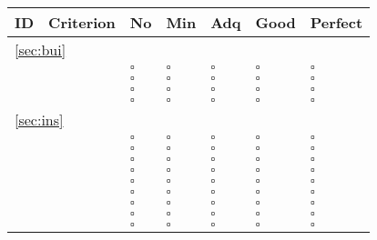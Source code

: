 \documentclass[a4paper,11pt]{article}
\begin{document}
\begin{table}[hbt]
	\begin{tabular}
		{ p{} | 
		  p{} |
		  p{} |
		  p{} |
		  p{} |
		  p{} |
		  p{} }
		\hline
		\textbf{ID} & \textbf{Criterion} & \textbf{No} & \textbf{Min} & \textbf{Adq} & \textbf{Good} & \textbf{Perfect} \\
        \hline
        \multicolumn{7}{l}{\ref{sec:bui}{ }\nameref{sec:bui}} \\
		\hline
		\hyperref[id:b1]{\bOneID} & \bOneText & $\square$ & $\square$ & $\square$ & $\square$ & $\square$ \\
		\hyperref[id:b2]{\bTwoID} & \bTwoText & $\square$ & $\square$ & $\square$ & $\square$ & $\square$ \\
		\hyperref[id:b3]{\bThreeID} & \bThreeText & $\square$ & $\square$ & $\square$ & $\square$ & $\square$ \\
		\hyperref[id:b4]{\bFourID} & \bFourText & $\square$ & $\square$ & $\square$ & $\square$ & $\square$ \\
		\hline			
		\multicolumn{7}{l}{\ref{sec:ins}{ }\nameref{sec:ins}} \\
		\hline
		\hyperref[id:is1]{\isOneID} & \isOneText & $\square$ & $\square$ & $\square$ & $\square$ & $\square$ \\
		\hyperref[id:is2]{\isTwoID} & \isTwoText & $\square$ & $\square$ & $\square$ & $\square$ & $\square$ \\
		\hyperref[id:is3]{\isThreeID} & \isThreeText & $\square$ & $\square$ & $\square$ & $\square$ & $\square$ \\
		\hyperref[id:is4]{\isFourID} & \isFourText & $\square$ & $\square$ & $\square$ & $\square$ & $\square$ \\
		\hyperref[id:is5]{\isFiveID} & \isFiveText & $\square$ & $\square$ & $\square$ & $\square$ & $\square$ \\
		\hyperref[id:is6]{\isSixID} & \isSixText & $\square$ & $\square$ & $\square$ & $\square$ & $\square$ \\
		\hyperref[id:is7]{\isSevenID} & \isSevenText & $\square$ & $\square$ & $\square$ & $\square$ & $\square$ \\
		\hyperref[id:is8]{\isEightID} & \isEightText & $\square$ & $\square$ & $\square$ & $\square$ & $\square$ \\
		\hyperref[id:is9]{\isNineID} & \isNineText & $\square$ & $\square$ & $\square$ & $\square$ & $\square$ \\

\end{tabular}
\end{table}
\end{document}
